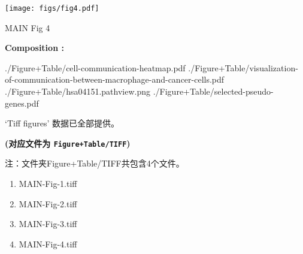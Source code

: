 \documentclass[
]{article}
\providecommand{\tightlist}{%
  \setlength{\itemsep}{0pt}\setlength{\parskip}{0pt}}
\begin{document}
\def\@captype{figure}
\begin{center}
\texttt{[image: figs/fig4.pdf]}
\caption{MAIN Fig 4}\label{fig:MAIN-Fig-4}
\end{center}
\begin{center}\begin{tcolorbox}[colback=gray!10, colframe=gray!50, width=0.9\linewidth, arc=1mm, boxrule=0.5pt]
\textbf{
Composition
:}

\vspace{0.5em}

    ./Figure+Table/cell-communication-heatmap.pdf \newline
./Figure+Table/visualization-of-communication-between-macrophage-and-cancer-cells.pdf
\newline ./Figure+Table/hsa04151.pathview.png \newline
./Figure+Table/selected-pseudo-genes.pdf

\vspace{2em}
\end{tcolorbox}
\end{center}

\begin{center}\vspace{1.5cm}\end{center}

\begin{center}\vspace{1.5cm}\end{center}

`Tiff figures' 数据已全部提供。

\textbf{(对应文件为 \texttt{Figure+Table/TIFF})}

\begin{center}\begin{tcolorbox}[colback=gray!10, colframe=gray!50, width=0.9\linewidth, arc=1mm, boxrule=0.5pt]注：文件夹Figure+Table/TIFF共包含4个文件。

\begin{enumerate}\tightlist
\item MAIN-Fig-1.tiff
\item MAIN-Fig-2.tiff
\item MAIN-Fig-3.tiff
\item MAIN-Fig-4.tiff
\end{enumerate}\end{tcolorbox}
\end{center}
\end{document}
